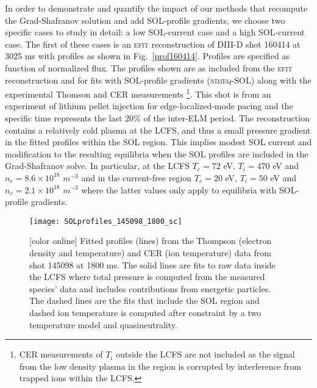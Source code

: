 \documentclass[english,aps,superscriptaddress,showkeys,showpacs,prepri,twocolumn]{revtex4}
\begin{document}
In order to demonstrate and quantify the impact of our methods that recompute
the Grad-Shafranov solution and add SOL-profile gradients, we choose two
specific cases to study in detail: a low SOL-current case and a high SOL-current case.  
The first of these cases is an \textsc{efit} reconstruction of
DIII-D shot 160414 at 3025 ms with profiles as shown in Fig.~\ref{prof160414}.
Profiles are specified as function of normalized flux. The profiles shown are as
included from the \textsc{efit} reconstruction and for fits with SOL-profile
gradients (\textsc{nimeq}-SOL) along with the experimental Thomson and CER
measurements 
\footnote{CER measurements of $T_i$ outside the LCFS are not
included as the signal from the low density plasma in the region is corrupted
by interference from trapped ions within the LCFS.}.
This shot is from an experiment of lithium pellet injection for edge-localized-mode pacing and
the specific time represents the last 20\% of the inter-ELM period.  The
reconstruction contains a relatively cold plasma at the LCFS, and thus a small
pressure gradient in the fitted profiles within the SOL region. This implies
modest SOL current and modification to the resulting equilibria when the SOL
profiles are included in the Grad-Shafranov solve.  In particular, at the LCFS
$T_e=72$ eV, $T_i=470$ eV and $n_e=8.6\times10^{18}$ $m^{-3}$ and in the
current-free region $T_e=20$ eV, $T_i=50$ eV and $n_e=2.1\times10^{18}$
$m^{-3}$ where the latter values only apply to equilibria with SOL-profile
gradients.

\begin{figure}
\begin{center}
\texttt{[image: SOLprofiles\_145098\_1800\_sc]}
\caption{ [color online]
Fitted profiles (lines) from the Thompson (electron density and temperature)
and CER (ion temperature) data from shot 145098 at 1800 ms. The solid lines are
fits to raw data inside the LCFS where total pressure is computed from the
measured species' data and includes contributions from energetic particles.
The dashed lines are the fits that include the SOL region and dashed ion
temperature is computed after constraint by a two temperature model and
quasineutrality.
}
\label{prof145098}
\end{center}
\end{figure}
\end{document}
